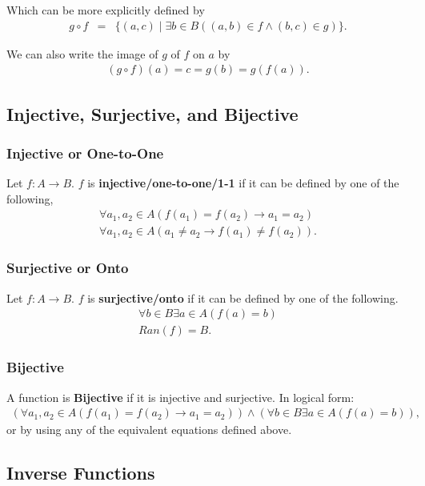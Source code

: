 \documentclass{article}
\begin{document}
\noindent Which can be more explicitly defined by
\begin{eqnarray*}
    g \circ f &=& \{ (a,c) \; | \; \exists b \in B ((a,b) \in f \land (b,c) \in g) \}.
\end{eqnarray*}

\noindent We can also write the image of $g$ of $f$ on $a$ by
\begin{eqnarray*}
    (g \circ f)(a) = c = g(b) = g(f(a)).
\end{eqnarray*}

\subsection{Injective, Surjective, and Bijective}
\subsubsection{Injective or One-to-One}
Let $f: A \rightarrow B$. $f$ is \textbf{injective/one-to-one/1-1} if it can be defined by one of the following,
\begin{eqnarray*}
    \forall a_1, a_2 \in A (f(a_1) = f(a_2) \rightarrow a_1 = a_2) \\
    \forall a_1, a_2 \in A(a_1 \neq a_2 \rightarrow f(a_1) \neq f(a_2)).
\end{eqnarray*}

\subsubsection{Surjective or Onto}
Let $f: A \rightarrow B$. $f$ is \textbf{surjective/onto} if it can be defined by one of the following.
\begin{eqnarray*}
    \forall b \in B \exists a \in A(f(a) = b) \\
    Ran(f) = B.
\end{eqnarray*}

\subsubsection{Bijective}
A function is \textbf{Bijective} if it is injective and surjective. In logical form:
\begin{eqnarray*}
    (\forall a_1, a_2 \in A (f(a_1) = f(a_2) \rightarrow a_1 = a_2)) \land (\forall b \in B \exists a \in A(f(a) = b)),
\end{eqnarray*}
\noindent or by using any of the equivalent equations defined above.

\subsection{Inverse Functions}
\end{document}
